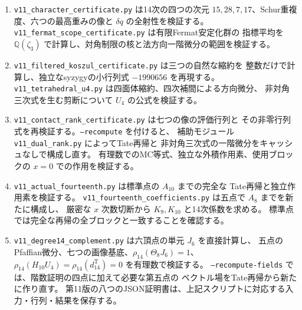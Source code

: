 \documentclass[a4paper,11pt]{ltjsarticle}
\theoremstyle{definition}
\begin{document}
\begin{enumerate}
 \item \texttt{v11\_character\_certificate.py} は14次の四つの次元
 $15,28,7,17$、Schur重複度、六つの最高重みの像と $\delta q$ の全射性を検証する。
 \texttt{v11\_fermat\_scope\_certificate.py} は有限Fermat安定化群の
 指標平均を $\mathbb Q(\zeta_3)$ で計算し、対角制限の核と法方向一階微分の範囲を検証する。
 \item \texttt{v11\_filtered\_koszul\_certificate.py} は三つの自然な縮約を
 整数だけで計算し、独立なsyzygyの小行列式 $-1990656$ を再現する。
 \texttt{v11\_tetrahedral\_u4.py} は四面体縮約、四次補間による方向微分、
 非対角三次式を生む剪断について $U_4$ の公式を検証する。
 \item \texttt{v11\_contact\_rank\_certificate.py} は七つの像の評価行列と
 その非零行列式を再検証する。\texttt{--recompute} を付けると、
 補助モジュール \texttt{v11\_dual\_rank.py} によってTate再帰と
 非対角三次式の一階微分をキャッシュなしで構成し直す。
 有理数でのMC等式、独立な外積作用素、使用ブロックの $x=0$ での作用を検証する。
 \item \texttt{v11\_actual\_fourteenth.py} は標準点の $A_{10}$ までの完全な
 Tate再帰と独立作用素を検証する。
 \texttt{v11\_fourteenth\_coefficients.py} は五点で $A_8$ までを新たに構成し、
 厳密な $x$ 次数切断から $K_9,K_{10}$ と14次係数を求める。
 標準点では完全な再帰の全ブロックと一致することを確認する。
 \item \texttt{v11\_degree14\_complement.py} は六頂点の単元 $J_6$ を直接計算し、
 五点のPfaffian微分、七つの画像基底、$\rho_{14}(\Theta_8J_6)=1$、
 $\rho_{14}(H_{10}U_4)=\rho_{14}(d^{\mathrm T}_{14})=0$ を有理数で検証する。
 \texttt{--recompute-fields} では、階数証明の四点に加えて必要な第五点の
 ベクトル場をTate再帰から新たに作り直す。
 第11版の八つのJSON証明書は、上記スクリプトに対応する入力・行列・結果を保存する。


\end{enumerate}
\end{document}
